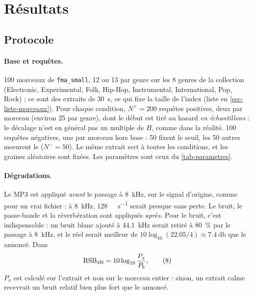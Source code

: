 \section{Résultats}
\label{sec-resultats}

\subsection{Protocole}
\label{sec-protocole}

\paragraph{Base et requêtes.} 100 morceaux de \texttt{fma\_small}, 12 ou 13 par genre sur
les 8 genres de la collection (Electronic, Experimental, Folk, Hip-Hop, Instrumental,
International, Pop, Rock) ; ce sont des extraits de \qty{30}{\second}, ce qui fixe la taille de
l'index (liste en \cref{sec-liste-morceaux}). Pour chaque condition, $N^+ = 200$ requêtes
positives, deux par morceau (environ 25 par genre), dont le début est tiré au hasard
\emph{en échantillons} : le décalage n'est en général pas un multiple de $H$, comme dans la
réalité. 100 requêtes négatives, une par morceau hors base : 50 fixent le seuil, les 50
autres mesurent le \TFD{} ($N^- = 50$). Le même extrait sert à toutes les conditions, et les
graines aléatoires sont fixées. Les paramètres sont ceux du \cref{tab-parametres}.

\paragraph{Dégradations.} Le MP3 est appliqué \emph{avant} le passage à
\qty{8}{\kilo\hertz}, sur le signal d'origine, comme pour un vrai fichier : à
\qty{8}{\kilo\hertz}, \qty{128}{\kilo\bit\per\second} serait presque sans perte. Le bruit, le
passe-bande et la réverbération sont appliqués \emph{après}. Pour le bruit, c'est
indispensable : un bruit blanc ajouté à \qty{44.1}{\kilo\hertz} serait retiré à
\qty{80}{\percent} par le passage à \qty{8}{\kilo\hertz}, et le \RSB{} réel serait meilleur de
$10\log_{10}(\num{22.05}/4) \approx \qty{7.4}{\decibel}$ que le \RSB{} annoncé. Dans
\begin{equation}
  \mathrm{RSB}_{\mathrm{dB}} = 10\log_{10}\frac{P_x}{P_b} ,
  \tag{8}
\end{equation}
$P_x$ est calculé sur l'extrait et non sur le morceau entier : sinon, un extrait calme
recevrait un bruit relatif bien plus fort que le \RSB{} annoncé.

